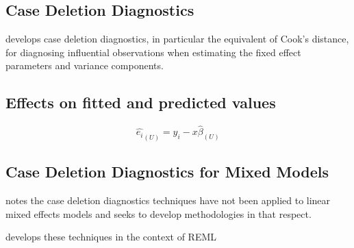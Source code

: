 \documentclass[Chap5amain.tex]{subfiles}
\begin{document}
 
 
% 
% 
% 
 
 

\newpage
\subsection{Case Deletion Diagnostics} %


\citet{CPJ} develops  case deletion diagnostics, in particular the equivalent of  Cook's distance, for diagnosing influential observations when estimating the fixed effect parameters and variance components.

\subsection{Effects on fitted and predicted values}
\begin{equation}
\hat{e_{i}}_{(U)} = y_{i} - x\hat{\beta}_{(U)}
\end{equation}




\subsection{Case Deletion Diagnostics for Mixed Models}

\citet{Christiansen} notes the case deletion diagnostics techniques have not been applied to linear mixed effects models and seeks to develop methodologies in that respect.

\citet{Christiansen} develops these techniques in the context of REML

\newpage
\end{document}
